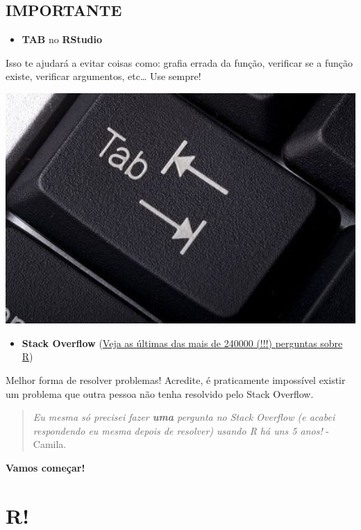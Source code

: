 \documentclass[]{book}
\providecommand{\tightlist}{%
  \setlength{\itemsep}{0pt}\setlength{\parskip}{0pt}}
\theoremstyle{definition}
\theoremstyle{definition}
\theoremstyle{definition}
\theoremstyle{remark}
\begin{document}
\section{IMPORTANTE}\label{importante}

\begin{itemize}
\tightlist
\item
  \textbf{TAB} no \textbf{RStudio}
\end{itemize}

Isso te ajudará a evitar coisas como: grafia errada da função, verificar
se a função existe, verificar argumentos, etc\ldots{} Use sempre!

\includegraphics[width=5.88in]{figuras/tab-key-}

\begin{itemize}
\tightlist
\item
  \textbf{Stack Overflow}
  (\href{https://stackoverflow.com/questions/tagged/r}{Veja as últimas
  das mais de 240000 (!!!) perguntas sobre R})
\end{itemize}

Melhor forma de resolver problemas! Acredite, é praticamente impossível
existir um problema que outra pessoa não tenha resolvido pelo Stack
Overflow.

\begin{quote}
\emph{Eu mesma só precisei fazer \textbf{uma} pergunta no Stack Overflow
(e acabei respondendo eu mesma depois de resolver) usando R há uns 5
anos!} - Camila.
\end{quote}

\textbf{Vamos começar!}

\chapter{R!}\label{r}
\end{document}
